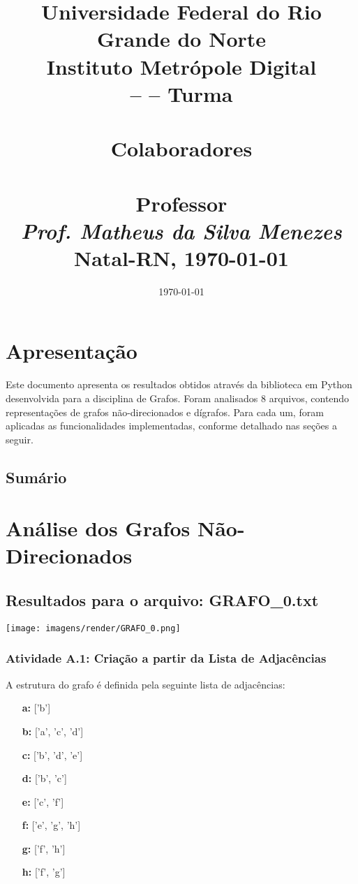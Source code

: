 \documentclass[a4paper,12pt]{article}
\date{\today}
\title{
    \vspace{-2.5cm} %
    \centering %
    \Large\textbf{Universidade Federal do Rio Grande do Norte}\\
    \large Instituto Metrópole Digital \\[0.5em]
    \normalsize \coddisciplina{} -- \nomedisciplina{} -- Turma \codturma \\[1.5em]
    \Large\textbf{\codatividade} \\[1.5em]
    \large\textbf{Colaboradores} \\
    \normalsize\textit{\nomedoaluno} \\[1em]
    \large\textbf{Professor} \\
    \normalsize\textit{Prof. Matheus da Silva Menezes} \\[2.5em]
    \normalsize Natal-RN, \today
    \vspace{-0.5cm} %
}
\author{}
\date{}
\begin{document}
\maketitle

\section*{\centering Apresentação}
Este documento apresenta os resultados obtidos através da biblioteca em Python desenvolvida para a disciplina de Grafos. Foram analisados 8 arquivos, contendo representações de grafos não-direcionados e dígrafos. Para cada um, foram aplicadas as funcionalidades implementadas, conforme detalhado nas seções a seguir.

\subsection*{Sumário}
\tableofcontents
\newpage

\section{Análise dos Grafos Não-Direcionados}

\subsection{Resultados para o arquivo: GRAFO\_0.txt}

\begin{center}
    \texttt{[image: imagens/render/GRAFO\_0.png]}
\end{center}

\subsubsection*{Atividade A.1: Criação a partir da Lista de Adjacências}
A estrutura do grafo é definida pela seguinte lista de adjacências:
\begin{itemize}[leftmargin=*]
    \item[\textbf{a:}] ['b']
    \item[\textbf{b:}] ['a', 'c', 'd']
    \item[\textbf{c:}] ['b', 'd', 'e']
    \item[\textbf{d:}] ['b', 'c']
    \item[\textbf{e:}] ['c', 'f']
    \item[\textbf{f:}] ['e', 'g', 'h']
    \item[\textbf{g:}] ['f', 'h']
    \item[\textbf{h:}] ['f', 'g']
\end{itemize}
\end{document}
